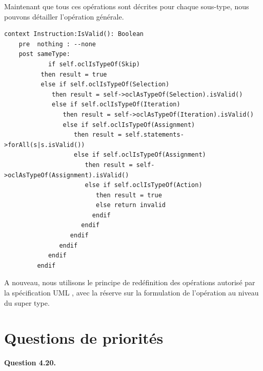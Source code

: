\documentclass[oneside,a4paper]{book}
\begin{document}
Maintenant que tous ces opérations sont décrites pour chaque sous-type, nous pouvons détailler l'opération générale.

\begin{minipage}{\linewidth}
        \begin{lstlisting}
context Instruction:IsValid(): Boolean
    pre  nothing : --none
    post sameType: 
            if self.oclIsTypeOf(Skip)
          then result = true
          else if self.oclIsTypeOf(Selection)
             then result = self->oclAsTypeOf(Selection).isValid()
             else if self.oclIsTypeOf(Iteration)
                then result = self->oclAsTypeOf(Iteration).isValid()
                else if self.oclIsTypeOf(Assignment)
                   then result = self.statements->forAll(s|s.isValid())
                   else if self.oclIsTypeOf(Assignment)
                      then result = self->oclAsTypeOf(Assignment).isValid()
                      else if self.oclIsTypeOf(Action)
                         then result = true
                         else return invalid
                        endif
                     endif
                  endif
               endif
            endif
         endif
        \end{lstlisting}
\end{minipage}

\begin{tcolorbox}
    A nouveau, nous utilisons le principe de redéfinition des opérations autorisé par la spécification UML \cite{uml251spec2017}, avec la réserve sur la formulation de l'opération au niveau du super type.
\end{tcolorbox}

\section{Questions de priorités}

\textbf{Question 4.20.}\label{Question 4.20.}\newline

\nopagebreak 
\end{document}
